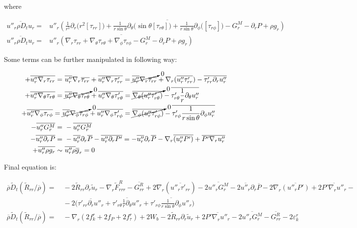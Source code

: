 \documentclass[10pt,paper=a4]{report}
\newcommand{\eht}{\overline}
\newcommand{\fht}{\widetilde}
\begin{document}
\noindent
where

\begin{align}
\eht{u''_r \rho D_t u_r} = & \eht{u''_r \left( \frac{1}{r^{2}} \partial_{r} \big( r^{2} [\tau_{rr}]\big) + \frac{1}{r\sin{\theta}}\partial_{\theta}(\sin{\theta}[\tau_{r\theta}]\big) + \frac{1}{r\sin{\theta}}\partial_{\phi}\big([\tau_{r\phi}]\big) - G_r^M - \partial_{r} P + \rho g_r \right) } \\
\eht{u''_r \rho D_t u_r} = & \eht{u''_r \left( \nabla_r \tau_{rr} + \nabla_\theta \tau_{r\theta} + \nabla_\phi \tau_{r\phi}  - G_r^M - \partial_{r} P + \rho g_r \right) }
\end{align}

\noindent
Some terms can be further manipulated in following way:

\begin{align}
+\eht{u''_r  \nabla_r \tau_{rr}} = & \ \eht{u''_r} \nabla_r \eht{\tau_{rr}} + \eht{u''_r \nabla_r \tau'_{rr}} =  \cancelto{0}{\eht{u''_r} \nabla_r \eht{\tau_{rr}}} + \nabla_r (\eht{u''_r \tau'_{rr}}) - \eht{\tau'_{rr}\partial_r u''_r} \\
+\eht{u''_r  \nabla_\theta \tau_{r\theta}} = & \ \cancelto{0}{\eht{u''_r} \nabla_\theta \eht{\tau_{r\theta}}} + \eht{u''_r \nabla_\theta \tau'_{r\theta}} = \cancelto{0}{\eht{\nabla_\theta (u''_r \tau'_{r\theta})}} - \eht{\tau'_{r\theta}\frac{1}{r}\partial_\theta u''_r }  & \\
+\eht{u''_r  \nabla_\phi \tau_{r\phi}} = \ & \cancelto{0}{\eht{u''_r} \nabla_\phi \eht{\tau_{r\phi}}} + \eht{u''_r \nabla_\phi \tau'_{r\phi}} = \cancelto{0}{\eht{\nabla_\phi (u''_r \tau'_{r\phi})}} - \eht{\tau'_{r\phi}\frac{1}{r\sin{\theta}}\partial_\phi u''_r } & \\
-\eht{u''_r G_r^M} = & \ -\eht{u''_r G_r^M} & \\
-\eht{u''_r \partial_r P} = & \ -\eht{u''_r} \partial_r \eht{P} - \eht{u''_r \partial_r P'} = -\eht{u''_r} \partial_r \eht{P} - \nabla_r \eht{(u''_r P')} + \eht{P'\nabla_r u''_r}  & \\ 
+\eht{u''_r \rho g_r} \sim & \ \eht{u''_r \rho} \eht{g}_r = 0 &
\end{align}

\noindent 
Final equation is:

\begin{align}
\eht{\rho}\fht{D}_t \left( \fht{R}_{rr} / \eht{\rho} \right) = & \ -2\fht{R}_{rr}\partial_r \fht{u}_r - \nabla_r \fht{F}_{rrr}^R - \eht{G_{rr}^R}  + 2\nabla_r (\eht{u''_r \tau'_{rr}}) -2\eht{u''_r G_r^M} - 2 \eht{u''_r} \partial_r \eht{P} - 2 \nabla_r \eht{(u''_r P')} + 2 \eht{P'\nabla_r u''_r} - \\
& \ -2 \big( \eht{\tau'_{rr}\partial_r u''_r} + \eht{\tau'_{r\theta}\frac{1}{r}\partial_\theta u''_r } + \eht{\tau'_{r\phi}\frac{1}{r\sin{\theta}}\partial_\phi u''_r }  \big) \nonumber \\
\eht{\rho}\fht{D}_t \left( \fht{R}_{rr} / \eht{\rho} \right) = & \ -\nabla_r ( 2 f_k^r + 2 f_P + 2 f_\tau^r ) + 2 W_b - 2\fht{R}_{rr}\partial_r \fht{u}_r + 2\eht{P'\nabla_r u''_r} - 2\overline{u''_r G^{M}_r} - \eht{G^{R}_{rr}} - 2\varepsilon_k^r
\end{align}
\end{document}

